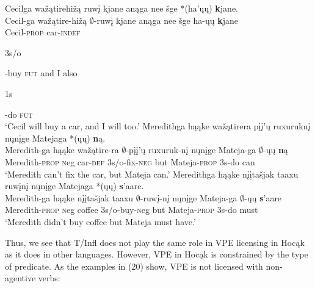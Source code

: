 \documentclass[output=paper]{LSP/langsci}
\begin{document}
\begin{exe}
\ex
\begin{xlist}
\ex
\glll Cecilga wa\v{z}\k{a}tirehi\v{z}\k{a} ruw\k{i} kjane an\k{a}ga nee \v{s}ge *(ha'\k{u}\k{u}) {\textbf kjane}.\\
Cecil-ga wa\v{z}\k{a}tire-hi\v{z}\k{a} $\emptyset$-ruw\k{i} kjane an\k{a}ga nee \v{s}ge ha-\k{u}\k{u} {\textbf kjane}\\
Cecil-\textsc{prop} car-\textsc{indef} \begin{sc}3s/o\end{sc}-buy \textsc{fut} and I also \begin{sc}1s\end{sc}-do \textsc{fut}\\
\trans `Cecil will buy a car, and I will too.' 
\ex
\glll Meredithga h\k{a}\k{a}ke wa\v{z}\k{a}tirera {p\k{i}\k{i}'\k{u} ruxurukn\k{i}} n\k{u}n\k{i}ge Matejaga *(\k{u}\k{u}) {\textbf n\k{a}}.\\
Meredith-ga h\k{a}\k{a}ke wa\v{z}\k{a}tire-ra {$\emptyset$-p\k{i}\k{i}'\k{u} ruxuruk-n\k{i}} n\k{u}n\k{i}ge Mateja-ga $\emptyset$-\k{u}\k{u} {\textbf n\k{a}}\\
Meredith-\textsc{prop} {\textsc neg} car-\textsc{def} {\textsc 3s/o}-fix-\textsc{neg} but Mateja-\textsc{prop} {\textsc 3s}-do can\\
\trans `Meredith can't fix the car, but Mateja can.'
\ex
\glll Meredithga h\k{a}\k{a}ke {n\k{i}\k{i}ta\v{s}jak taaxu} ruw\k{i}n\k{i} n\k{u}n\k{i}ge Matejaga *(\k{u}\k{u}) {\textbf s'aare}.\\ 
Meredith-ga h\k{a}\k{a}ke {n\k{i}\k{i}ta\v{s}jak taaxu} $\emptyset$-ruw\k{i}-n\k{i} n\k{u}n\k{i}ge Mateja-ga $\emptyset$-\k{u}\k{u} {\textbf s'aare}\\
Meredith-\textsc{prop} {\textsc neg} coffee {\textsc 3s/o}-buy-{\textsc neg} but Mateja-\textsc{prop} {\textsc 3s}-do must\\
\trans `Meredith didn't buy coffee but Mateja must have.' 
\end{xlist}
\end{exe}

Thus, we see that T/Infl does not play the same role in VPE licensing in Hoc\k{a}k as it does in other languages. However, VPE in Hoc\k{a}k is constrained by the type of predicate. As the examples in (20) show, VPE is not licensed with non-agentive verbs:
\end{document}
